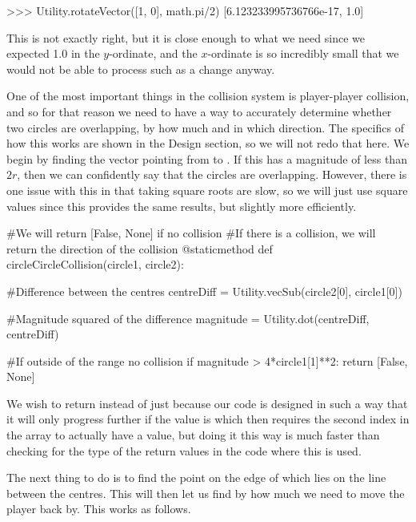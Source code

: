\begin{mpy}
>>> Utility.rotateVector([1, 0], math.pi/2)
[6.123233995736766e-17, 1.0]
\end{mpy}

This is not exactly right, but it is close enough to what we need since we expected 1.0 in the $y$-ordinate, and the $x$-ordinate is so incredibly small that we would not be able to process such as a change anyway.


\vs
One of the most important things in the collision system is player-player collision, and so for that reason we need to have a way to accurately determine whether two circles are overlapping, by how much and in which direction. The specifics of how this works are shown in the Design section, so we will not redo that here. We begin by finding the vector pointing from  to . If this has a magnitude of less than $2r$, then we can confidently say that the circles are overlapping. However, there is one issue with this in that taking square roots are slow, so we will just use square values since this provides the same results, but slightly more efficiently.

\begin{mpy}
    #We will return [False, None] if no collision
    #If there is a collision, we will return the direction of the collision
    @staticmethod
    def circleCircleCollision(circle1, circle2):

        #Difference between the centres
        centreDiff = Utility.vecSub(circle2[0], circle1[0])

        #Magnitude squared of the difference
        magnitude = Utility.dot(centreDiff, centreDiff)

        #If outside of the range no collision
        if magnitude > 4*circle1[1]**2:
            return [False, None]
\end{mpy}

We wish to return  instead of just  because our code is designed in such a way that it will only progress further if the value is  which then requires the second index in the array to actually have a value, but doing it this way is much faster than checking for the type of the return values in the code where this is used.

\vs
The next thing to do is to find the point on the edge of  which lies on the line between the centres. This will then let us find by how much we need to move the player back by. This works as follows.

